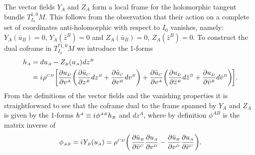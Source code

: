 \documentclass[11pt]{amsart}
\theoremstyle{remark}
\theoremstyle{remark}
\theoremstyle{definition}
\theoremstyle{definition}
\theoremstyle{definition}
\newcommand{\0}{{\scriptstyle 0'}} %
\newcommand{\1}{{\scriptstyle 1'}}
\newcommand{\A}{{\scriptscriptstyle A}} %
\newcommand{\B}{{\scriptscriptstyle B}}
\newcommand{\C}{{\scriptscriptstyle C}}
\newcommand{\D}{{\scriptscriptstyle D}}
\newcommand{\pt}{\hspace{1pt}} %
\newcommand{\hp}{\hspace{0.5pt}} %
\newcommand{\npt}{\hspace{-1pt}} %
\begin{document}
The vector fields $Y_{\A}$ and $Z_{\A}$ form a local frame for the holomorphic tangent bundle $T^{1,0}_{I_0}M$. This follows from the observation that their action on a complete set of coordinates anti-holomorphic with respect to $I_0$ vanishes, namely: $Y_{\A}(\bar{u}_{\B}) = 0$, $Y_{\A}(\bar{z}^{\B}) = 0$ and $Z_{\A}(\bar{u}_{\B}) = 0$, $Z_{\A}(\bar{z}^{\B}) = 0$. To construct the dual coframe in \mbox{$T^{*1,0}_{I_0} M$} we introduce the 1-forms
{\allowdisplaybreaks
\begin{align}
h_{\A} & = du_{\A} - Z_{\B}(u_{\A}) \hp dz^{\B} \\
& = i \hp \rho^{\C\D} \bigg[ \frac{\partial u_{\D}}{\partial v^{\A}} \bigg( \frac{\partial \bar{u}_{\C}}{\partial z^{\B}}dz^{\B} + \frac{\partial \bar{u}_{\C}}{\partial v^{\B}}dv^{\B} \bigg) + \frac{\partial \bar{u}_{\C}}{\partial v^{\A}} \bigg( \frac{\partial u_{\D}}{\partial \bar{z}^{\B}}d\bar{z}^{\B} + \frac{\partial u_{\D}}{\partial \bar{v}^{\B}}d\bar{v}^{\B} \bigg) \npt \bigg]  \rlap{.} \nonumber
\end{align}
}%
From the definitions of the vector fields and the vanishing properties it is straightforward to see that the coframe dual to the frame spanned by $Y_{\A}$ and $Z_{\A}$ is given by the 1-forms $h^{\A} \equiv i \hp \phi^{\A\B} h_{\B}$ and $dz^{\A}$, where by definition $\phi^{\A\B}$ is the matrix inverse of
\begin{equation}
\phi_{\A\B} = i \hp Y_{\B}(u_{\A}) = \rho^{\C\D} \bigg( \pt \frac{\partial \bar{u}_{\B}}{\partial \bar{v}^{\C}} \frac{\partial u_{\A}}{\partial v^{\D}} - \frac{\partial \bar{u}_{\B}}{\partial v^{\D}} \frac{\partial u_{\A}}{\partial \bar{v}^{\C}} \bigg) \rlap{.}
\end{equation}
\end{document}
